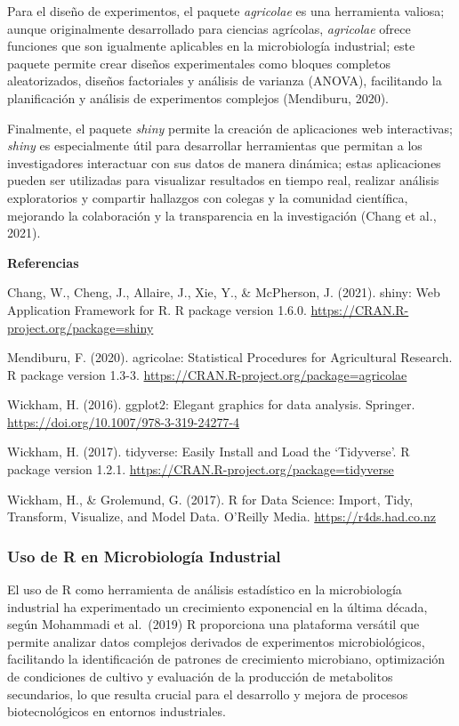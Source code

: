 \documentclass[
  letterpaper,
  DIV=11,
  numbers=noendperiod]{scrreprt}
\begin{document}
Para el diseño de experimentos, el paquete \emph{agricolae} es una
herramienta valiosa; aunque originalmente desarrollado para ciencias
agrícolas, \emph{agricolae} ofrece funciones que son igualmente
aplicables en la microbiología industrial; este paquete permite crear
diseños experimentales como bloques completos aleatorizados, diseños
factoriales y análisis de varianza (ANOVA), facilitando la planificación
y análisis de experimentos complejos (Mendiburu, 2020).

Finalmente, el paquete \emph{shiny} permite la creación de aplicaciones
web interactivas; \emph{shiny} es especialmente útil para desarrollar
herramientas que permitan a los investigadores interactuar con sus datos
de manera dinámica; estas aplicaciones pueden ser utilizadas para
visualizar resultados en tiempo real, realizar análisis exploratorios y
compartir hallazgos con colegas y la comunidad científica, mejorando la
colaboración y la transparencia en la investigación (Chang et al.,
2021).

\textbf{Referencias}

Chang, W., Cheng, J., Allaire, J., Xie, Y., \& McPherson, J. (2021).
shiny: Web Application Framework for R. R package version 1.6.0.
\url{https://CRAN.R-project.org/package=shiny}

Mendiburu, F. (2020). agricolae: Statistical Procedures for Agricultural
Research. R package version 1.3-3.
\url{https://CRAN.R-project.org/package=agricolae}

Wickham, H. (2016). ggplot2: Elegant graphics for data analysis.
Springer. \url{https://doi.org/10.1007/978-3-319-24277-4}

Wickham, H. (2017). tidyverse: Easily Install and Load the `Tidyverse'.
R package version 1.2.1.
\url{https://CRAN.R-project.org/package=tidyverse}

Wickham, H., \& Grolemund, G. (2017). R for Data Science: Import, Tidy,
Transform, Visualize, and Model Data. O'Reilly Media.
\url{https://r4ds.had.co.nz}

\subsubsection{Uso de R en Microbiología
Industrial}\label{uso-de-r-en-microbiologuxeda-industrial}

El uso de R como herramienta de análisis estadístico en la microbiología
industrial ha experimentado un crecimiento exponencial en la última
década, según Mohammadi et al.~(2019) R proporciona una plataforma
versátil que permite analizar datos complejos derivados de experimentos
microbiológicos, facilitando la identificación de patrones de
crecimiento microbiano, optimización de condiciones de cultivo y
evaluación de la producción de metabolitos secundarios, lo que resulta
crucial para el desarrollo y mejora de procesos biotecnológicos en
entornos industriales.
\end{document}
